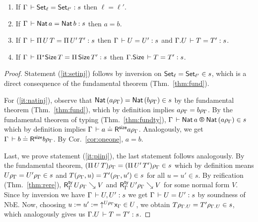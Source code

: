 \documentclass[acmlarge,review,anonymous]{acmart}\settopmatter{printfolios=true}
\begin{document}
\begin{corollary}
\label{cor:piinj}
\bla
\begin{enumerate}
\item \label{it:setinj}
  If\/ $\Gamma \der \Set[\ell] = \Set[\ell'] : s$ then $\ell = \ell'$.
\item \label{it:natinj}
  If\/ $\Gamma \der \Nat a = \Nat b : s$ then $a = b$.
\item \label{it:piinj}
  If\/ $\Gamma \der \piT U T = \piT{U'}{T'} : s$ then
  $\Gamma \der U = U' : s$ and
  $\cext \Gamma U \der T = T' : s$.
\item \label{it:allinj}
  If\/ $\Gamma \der \epiT \Size T = \piT{\Size}{T'} : s$ then
  $\cext \Gamma \Size \der T = T' : s$.
\end{enumerate}
\end{corollary}
\begin{proof}
\bla
Statement (\ref{it:setinj}) follows by inversion on  $\Set[\ell] = \Set[\ell'] \in s$, which is a direct consequence of the fundamental theorem (Thm.~\ref{thm:fund}).

For (\ref{it:natinj}), observe that $\Nat (a\rhog) = \Nat (b\rhog) \in s$
by the fundamental theorem (Thm.~\ref{thm:fund}), which by definition implies $a\rhog = b\rhog$. %
By the fundamental theorem of typing (Thm.~\ref{thm:fundty}), $\LRTS \Gamma {\Nat a} {\Nat (a\rhog)} s$
which by definition implies $\LRSize \Gamma a {a\rhog}$.  Analogously, we get $\LRSize \Gamma b {b\rhog}$.
By Cor.~\ref{cor:oneone}, $a = b$.


Last, we prove statement (\ref{it:piinj}), the last statement follows analogously.
By the fundamental theorem,
$(\piT U T)\rhog = (\piT{U'}{T'})\rhog \in s$ which by definition means
$U\rhog = U'\rhog \in s$ and $T(\rhog,u) = T'(\rhog,u') \in s$ for all $u = u' \in s$.
By reification (Thm.~\ref{thm:rere}),
$\RTy\Gamma {U\rhog} V$ and $\RTy\Gamma {U'\rhog} V$ for some normal form
$V$.
Since by inversion we have $\Gamma \der U,U' : s$ we get $\Gamma \der U = U' : s$ by soundness of NbE.
Now, choosing $u := u' := \up {U\rhog} \var\Gamma \in U$, we obtain
$T\rhogu = T' \rhogu \in s$, which analogously gives us $\cext\Gamma U \der T = T' : s$.
\end{proof}
\end{document}
